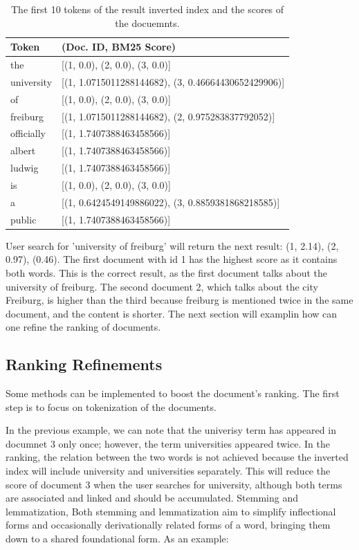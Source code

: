 \begin{table}[ht] 
{\footnotesize
\begin{tabular}{ P{2.5cm} ||P{11.1cm}  }      %
 \hline \hline
Token & (Doc. ID, BM25 Score)\T\B 
\\ 
\hline
the & [(1, 0.0), (2, 0.0), (3, 0.0)] \T\B 
\\ 
\hline
university &  [(1, 1.0715011288144682), (3, 0.46664430652429906)] \T\B 
\\ 
\hline
of  &  [(1, 0.0), (2, 0.0), (3, 0.0)] \T\B 
\\
\hline
freiburg  &  [(1, 1.0715011288144682), (2, 0.975283837792052)] \T\B 
\\ 
\hline
officially  &  [(1, 1.7407388463458566)] \T\B 
\\ 
\hline
albert  & [(1, 1.7407388463458566)]\T\B 
\\ 
\hline
ludwig  &  [(1, 1.7407388463458566)] \T\B 
\\ 
\hline
is  & [(1, 0.0), (2, 0.0), (3, 0.0)] \T\B 
\\ 
\hline
a  & [(1, 0.6424549149886022), (3, 0.8859381868218585)] \T\B 
\\ 
\hline
public  &  [(1, 1.7407388463458566)] \T\B 
\\ 
\hline \hline
    \end{tabular}
}
  \captionsetup{justification=centering,margin=2cm}
  \caption{The first 10 tokens of the result inverted index and the scores of the docuemnts. }
\end{table}

User search for 'university of freiburg' will return the next result: (1, 2.14), (2, 0.97), (0.46). The first document with id 1 has the highest score as it contains both words. This is the correct result, as the first document talks about the university of freiburg. The second document 2, which talks about the city Freiburg, is higher than the third because freiburg is mentioned twice in the same document, and the content is shorter. The next section will examplin how can one refine the ranking of documents.

\subsection{Ranking Refinements}
Some methods can be implemented to boost the document's ranking. The first step is to focus on tokenization of the documents. 

In the previous example, we can note that the univerisy term has appeared in documnet 3 only once; however, the term universities appeared twice. In the ranking, the relation between the two words is not achieved because the inverted index will include university and universities separately. This will reduce the score of document 3 when the user searches for university, although both terms are associated and linked and should be accumulated. Stemming and lemmatization, Both stemming and lemmatization aim to simplify inflectional forms and occasionally derivationally related forms of a word, bringing them down to a shared foundational form. As an example:

